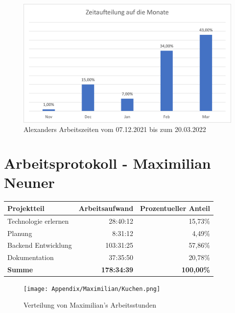 \begin{figure}[H]
    \begin{center}
        \includegraphics[width=1\textwidth]{images/Zeiten/Zeitaufteilung-auf-Monate-Bertoni.png}
        \caption{Alexanders Arbeitszeiten vom 07.12.2021 bis zum 20.03.2022}
    \end{center}
\end{figure}


\section*{Arbeitsprotokoll - Maximilian Neuner}

\begin{table}[H]
    \begin{tabular}{lrr}
        \hline
        \textbf{Projektteil} & \textbf{Arbeitsaufwand} & \textbf{Prozentueller Anteil} \\ \hline
        Technologie erlernen & 28:40:12                & 15,73\%                       \\
        Planung              & 8:31:12                 & 4,49\%                        \\
        Backend Entwicklung  & 103:31:25               & 57,86\%                       \\
        Dokumentation        & 37:35:50                & 20,78\%                       \\ \hline
        \textbf{Summe}       & \textbf{178:34:39}      & \textbf{100,00\%}             \\ \hline
    \end{tabular}
\end{table}

\begin{figure}[H]
    \begin{center}
        \texttt{[image: Appendix/Maximilian/Kuchen.png]}
        \caption{Verteilung von Maximilian's Arbeitsstunden}
    \end{center}
\end{figure}

